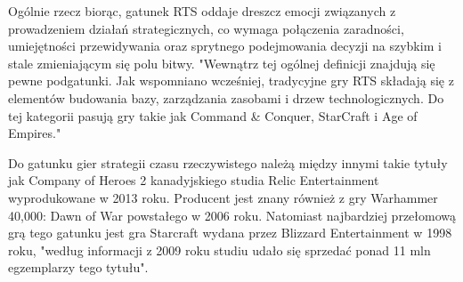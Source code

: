 Ogólnie rzecz biorąc, gatunek RTS oddaje dreszcz emocji związanych z prowadzeniem działań strategicznych, co wymaga połączenia zaradności,
umiejętności przewidywania oraz sprytnego podejmowania decyzji na szybkim i stale zmieniającym się polu bitwy.
"Wewnątrz tej ogólnej definicji znajdują się pewne podgatunki. Jak wspomniano wcześniej, tradycyjne gry RTS składają się z elementów budowania bazy, zarządzania zasobami i drzew technologicznych. Do tej kategorii pasują gry takie jak Command \& Conquer, StarCraft i Age of Empires."\cite{stateoftherts}

Do gatunku gier strategii czasu rzeczywistego należą między innymi takie tytuły jak Company of Heroes 2 kanadyjskiego studia 
Relic Entertainment wyprodukowane w 2013 roku. Producent jest znany również z gry Warhammer 40,000: Dawn of War powstałego w 2006 roku.
Natomiast najbardziej przełomową grą tego gatunku jest gra Starcraft wydana przez Blizzard Entertainment w 1998 roku, "według informacji z 2009 roku studiu udało się sprzedać ponad 11 mln egzemplarzy tego tytułu"\cite{rtslist}.
